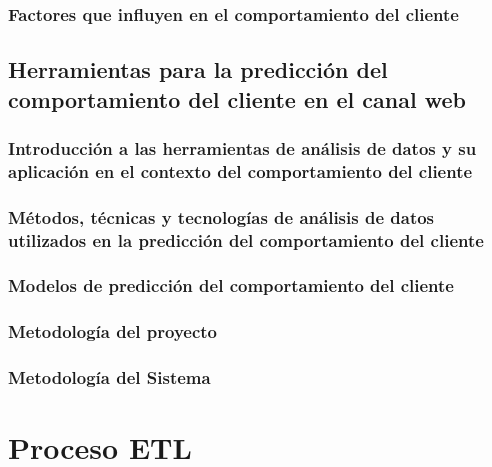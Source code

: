 \documentclass{report}
\begin{document}
\subsection{Factores que influyen en el comportamiento del cliente}


\section{Herramientas para la predicción del comportamiento del cliente en el canal web}

\subsection{Introducción a las herramientas de análisis de datos y su aplicación en el contexto del comportamiento del cliente}


\subsection{Métodos, técnicas y tecnologías de análisis de datos utilizados en la predicción del comportamiento del cliente}


\subsection{Modelos de predicción del comportamiento del cliente}


\subsection{Metodología del proyecto}


\subsection{Metodología del Sistema}


\chapter{Proceso ETL}
\newpage
\end{document}
